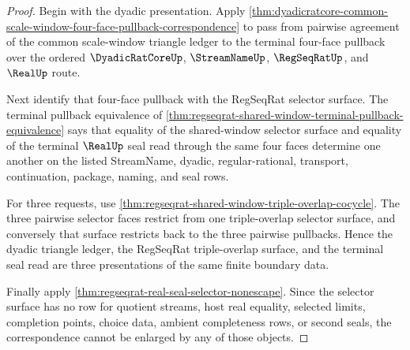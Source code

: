 \begin{proof}
Begin with the dyadic presentation. Apply \autoref{thm:dyadicratcore-common-scale-window-four-face-pullback-correspondence} to pass from pairwise agreement of the common scale-window triangle ledger to the terminal four-face pullback over the ordered $\DyadicRatCoreUp$, $\StreamNameUp$, $\RegSeqRatUp$, and $\RealUp$ route.

Next identify that four-face pullback with the RegSeqRat selector surface. The terminal pullback equivalence of \autoref{thm:regseqrat-shared-window-terminal-pullback-equivalence} says that equality of the shared-window selector surface and equality of the terminal $\RealUp$ seal read through the same four faces determine one another on the listed StreamName, dyadic, regular-rational, transport, continuation, package, naming, and seal rows.

For three requests, use \autoref{thm:regseqrat-shared-window-triple-overlap-cocycle}. The three pairwise selector faces restrict from one triple-overlap selector surface, and conversely that surface restricts back to the three pairwise pullbacks. Hence the dyadic triangle ledger, the RegSeqRat triple-overlap surface, and the terminal seal read are three presentations of the same finite boundary data.

Finally apply \autoref{thm:regseqrat-real-seal-selector-nonescape}. Since the selector surface has no row for quotient streams, host real equality, selected limits, completion points, choice data, ambient completeness rows, or second seals, the correspondence cannot be enlarged by any of those objects.
\end{proof}

